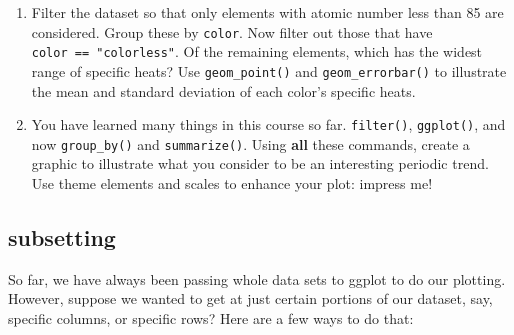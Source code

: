 \documentclass[
]{krantz}
\begin{document}
\begin{enumerate}
\item
  Filter the dataset so that only elements with atomic number less than 85 are considered. Group these by \texttt{color}. Now filter out those that have \texttt{color\ ==\ "colorless"}. Of the remaining elements, which has the widest range of specific heats? Use \texttt{geom\_point()} and \texttt{geom\_errorbar()} to illustrate the mean and standard deviation of each color's specific heats.
\item
  You have learned many things in this course so far. \texttt{filter()}, \texttt{ggplot()}, and now \texttt{group\_by()} and \texttt{summarize()}. Using \textbf{all} these commands, create a graphic to illustrate what you consider to be an interesting periodic trend. Use theme elements and scales to enhance your plot: impress me!
\end{enumerate}

\hypertarget{subsetting}{%
\subsection{subsetting}\label{subsetting}}

So far, we have always been passing whole data sets to ggplot to do our plotting. However, suppose we wanted to get at just certain portions of our dataset, say, specific columns, or specific rows? Here are a few ways to do that:
\end{document}

